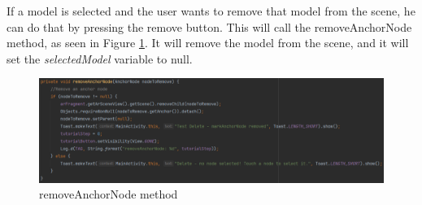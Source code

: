 If a model is selected and the user wants to remove that model from the scene, he can do that by pressing the remove button. This will call the removeAnchorNode method, as seen in Figure \ref{fig:removeAnchorNode}. It will remove the model from the scene, and it will set the \textit{selectedModel} variable to null.

\begin{figure}[H]
    \centering
    \includegraphics[width=1\textwidth]{img/code/removeAnchorNode.png}
    \caption{removeAnchorNode method}
    \label{fig:removeAnchorNode}
\end{figure}